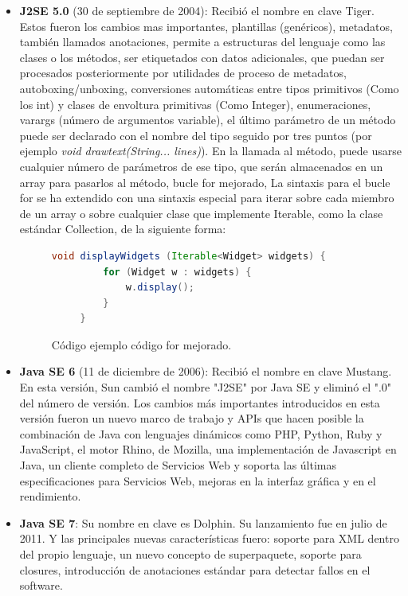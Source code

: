 \begin{itemize}
    \item \textbf{J2SE 5.0} (30 de septiembre de 2004): Recibió el nombre en clave Tiger. Estos fueron los cambios mas importantes, plantillas (genéricos), metadatos, también llamados anotaciones, permite a estructuras del lenguaje como las clases o los métodos, ser etiquetados con datos adicionales, que puedan ser procesados posteriormente por utilidades de proceso de metadatos, autoboxing/unboxing, conversiones automáticas entre tipos primitivos (Como los int) y clases de envoltura primitivas (Como Integer), enumeraciones, varargs (número de argumentos variable), el último parámetro de un método puede ser declarado con el nombre del tipo seguido por tres puntos (por ejemplo \textit{void drawtext(String... lines)}). En la llamada al método, puede usarse cualquier número de parámetros de ese tipo, que serán almacenados en un array para pasarlos al método, bucle for mejorado, La sintaxis para el bucle for se ha extendido con una sintaxis especial para iterar sobre cada miembro de un array o sobre cualquier clase que implemente Iterable, como la clase estándar Collection, de la siguiente forma:
\begin{figure}
	\begin{lstlisting}[language=Java]
	 void displayWidgets (Iterable<Widget> widgets) {
		 for (Widget w : widgets) {
		     w.display();
		 }
	 }
	\end{lstlisting}
	\caption{Código ejemplo código for mejorado.}
\end{figure}

    \item \textbf{Java SE 6} (11 de diciembre de 2006): Recibió el nombre en clave Mustang. En esta versión, Sun cambió el nombre "J2SE" por Java SE y eliminó el ".0" del número de versión. Los cambios más importantes introducidos en esta versión fueron un nuevo marco de trabajo y APIs que hacen posible la combinación de Java con lenguajes dinámicos como PHP, Python, Ruby y JavaScript, el motor Rhino, de Mozilla, una implementación de Javascript en Java, un cliente completo de Servicios Web y soporta las últimas especificaciones para Servicios Web, mejoras en la interfaz gráfica y en el rendimiento.
    
    \item \textbf{Java SE 7}: Su nombre en clave es Dolphin. Su lanzamiento fue en julio de 2011. Y las principales nuevas características fuero: soporte para XML dentro del propio lenguaje, un nuevo concepto de superpaquete, soporte para closures, introducción de anotaciones estándar para detectar fallos en el software.

\end{itemize}

